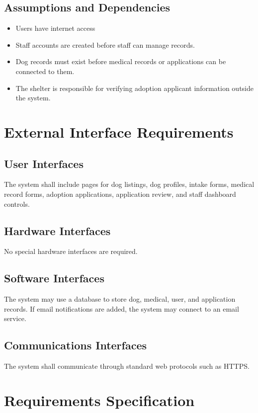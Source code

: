 \documentclass[12pt]{article}
\begin{document}
\subsection{Assumptions and Dependencies}
\begin{itemize}\item Users have internet access\end{itemize}
\begin{itemize}\item Staff accounts are created before staff can manage records.\end{itemize}
\begin{itemize}\item Dog records must exist before medical records or applications can be connected to them.\end{itemize}
\begin{itemize}\item The shelter is responsible for verifying adoption applicant information outside the system.\end{itemize}
\section{External Interface Requirements}
\subsection{User Interfaces}
The system shall include pages for dog listings, dog profiles, intake forms, medical record forms, adoption applications, application review, and staff dashboard controls.
\subsection{Hardware Interfaces}
No special hardware interfaces are required.
\subsection{Software Interfaces}
The system may use a database to store dog, medical, user, and application records. If email notifications are added, the system may connect to an email service.
\subsection{Communications Interfaces}
The system shall communicate through standard web protocols such as HTTPS.
\section{Requirements Specification}
\end{document}
